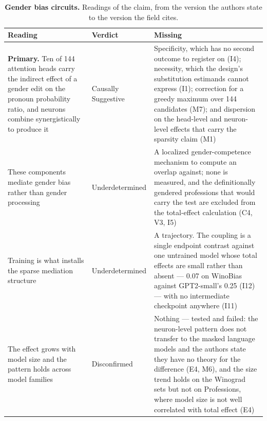 \clearpage
\begin{table}[H]
\centering
\footnotesize
\caption{\textbf{Gender bias circuits.} Readings of the claim, from the version the authors state to the version the
field cites.}
\label{tab:gender-readings}
\renewcommand{\arraystretch}{1.18}
\begin{tabular}{@{}>{\raggedright\arraybackslash}p{3.3cm}l>{\raggedright\arraybackslash}p{4.4cm}@{}}
\toprule
\textbf{Reading} & \textbf{Verdict} & \textbf{Missing} \\
\midrule
\textbf{Primary.} Ten of 144 attention heads carry the indirect effect of a gender edit on the pronoun probability ratio, and neurons combine synergistically to produce it
  & Causally Suggestive
  & Specificity, which has no second outcome to register on (I4); necessity, which the design's substitution estimands cannot express (I1); correction for a greedy maximum over 144 candidates (M7); and dispersion on the head-level and neuron-level effects that carry the sparsity claim (M1) \\
\addlinespace[2pt]
These components mediate gender bias rather than gender processing
  & Underdetermined
  & A localized gender-competence mechanism to compute an overlap against; none is measured, and the definitionally gendered professions that would carry the test are excluded from the total-effect calculation (C4, V3, I5) \\
\addlinespace[2pt]
Training is what installs the sparse mediation structure
  & Underdetermined
  & A trajectory. The coupling is a single endpoint contrast against one untrained model whose total effects are small rather than absent --- 0.07 on WinoBias against GPT2-small's 0.25 (I12) --- with no intermediate checkpoint anywhere (I11) \\
\addlinespace[2pt]
The effect grows with model size and the pattern holds across model families
  & Disconfirmed
  & Nothing --- tested and failed: the neuron-level pattern does not transfer to the masked language models and the authors state they have no theory for the difference (E4, M6), and the size trend holds on the Winograd sets but not on Professions, where model size is not well correlated with total effect (E4) \\
\bottomrule
\end{tabular}
\end{table}

